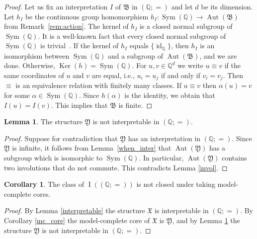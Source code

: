 \documentclass{amsart}
\theoremstyle{definition}
\newtheorem{lemma}[theorem]{Lemma}
\newtheorem{corollary}[theorem]{Corollary}
\theoremstyle{remark}
\numberwithin{equation}{section}
\DeclareMathOperator{\I}{\operatorname{I}}
\newcommand{\aut}{\operatorname{Aut}}
\newcommand{\sym}{\operatorname{Sym}}
\newcommand{\id}{\operatorname{id}}
\newcommand{\atoms}{({\mathbb Q};=)}
\newcommand{\fb}{\mathfrak{B}}
\newcommand{\fx}{\mathfrak{X}}
\newcommand{\fy}{\mathfrak{Y}}
\newcommand{\same}{\equiv}
\newcommand{\kernel}{\operatorname{Ker}}
\begin{document}
\begin{proof}
	Let us fix an interpretation $I$ of $\fb$ in $\atoms$ and let $d$ be its dimension. 
    Let $h_I$ be the continuous group homomorphism $h_I \colon \sym(\mathbb{Q})\rightarrow \aut(\fb)$ from Remark~\ref{rem:action}. The kernel of $h_I$ is a closed normal subgroup of $\sym({\mathbb Q})$. It is a well-known fact that every closed normal subgroup of $\sym({\mathbb Q})$ is trivial~\cite{SchreierUlam}. If the kernel of {$h_I$} equals $\{\id_{{\mathbb Q}}\}$, then $h_I$ is an isomorphism between $\sym({\mathbb Q})$ and a subgroup of $\aut(\fb)$, and we are done. Otherwise, $\kernel(h)=\sym({\mathbb Q})$. For $u,v\in {\mathbb Q}^d$ we write $u\same v$ if the same coordinates of $u$ and $v$ are equal, i.e., $u_i=u_j$ if and only if $v_i=v_j$. Then $\same$ is an equivalence relation with finitely many classes. If $u\same v$ then $\alpha(u)=v$ for some $\alpha\in \sym({\mathbb Q})$. Since $h(\alpha)$ is the identity, we obtain that $I(u) = I(v)$.  This implies that $\fb$ is finite.
\end{proof}

\begin{lemma}\label{not_inter}
	The structure $\fy$ is not interpretable in  $\atoms$.
\end{lemma}

\begin{proof}
	Suppose for contradiction that $\fy$ has an interpretation in $\atoms$. Since $\fy$ is infinite, it follows from Lemma~\ref{when_inter} that $\aut(\fy)$ has a subgroup which is isomorphic to $\sym({\mathbb Q})$. In particular, $\aut(\fy)$ contains two involutions that do not commute. This contradicts Lemma \ref{invol}.
\end{proof}

\begin{corollary}\label{not_closed_mc}
	The class of $\I(\atoms)$ is not closed under taking model-complete cores.
\end{corollary}

\begin{proof}
	By Lemma \ref{interpretable} the structure $\fx$ is interpretable in  $\atoms$. By Corollary \ref{mc_core} the model-complete core of $\fx$ is $\fy$, and by Lemma \ref{not_inter} the structure $\fy$ is not interpretable in  $\atoms$.
\end{proof}

\end{document}
